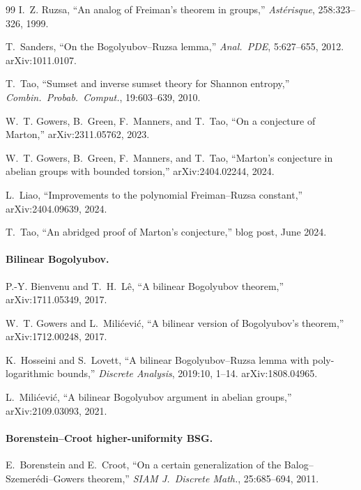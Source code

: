 \documentclass[11pt,a4paper]{article}
\theoremstyle{plain}
\theoremstyle{definition}
\theoremstyle{remark}
\begin{document}
\begin{thebibliography}{99}
I.~Z. Ruzsa, ``An analog of Freiman's theorem in groups,'' \emph{Ast\'erisque}, 258:323--326, 1999.

T.~Sanders, ``On the Bogolyubov--Ruzsa lemma,'' \emph{Anal.\ PDE}, 5:627--655, 2012. arXiv:1011.0107.

T.~Tao, ``Sumset and inverse sumset theory for Shannon entropy,'' \emph{Combin.\ Probab.\ Comput.}, 19:603--639, 2010.

W.~T. Gowers, B.~Green, F.~Manners, and T.~Tao, ``On a conjecture of Marton,'' arXiv:2311.05762, 2023.

W.~T. Gowers, B.~Green, F.~Manners, and T.~Tao, ``Marton's conjecture in abelian groups with bounded torsion,'' arXiv:2404.02244, 2024.

L.~Liao, ``Improvements to the polynomial Freiman--Ruzsa constant,'' arXiv:2404.09639, 2024.

T.~Tao, ``An abridged proof of Marton's conjecture,'' blog post, June 2024.

\paragraph{Bilinear Bogolyubov.}

P.-Y. Bienvenu and T.~H.~L\^e, ``A bilinear Bogolyubov theorem,'' arXiv:1711.05349, 2017.

W.~T. Gowers and L.~Mili\'cevi\'c, ``A bilinear version of Bogolyubov's theorem,'' arXiv:1712.00248, 2017.

K.~Hosseini and S.~Lovett, ``A bilinear Bogolyubov--Ruzsa lemma with poly-logarithmic bounds,'' \emph{Discrete Analysis}, 2019:10, 1--14. arXiv:1808.04965.

L.~Mili\'cevi\'c, ``A bilinear Bogolyubov argument in abelian groups,'' arXiv:2109.03093, 2021.

\paragraph{Borenstein--Croot higher-uniformity BSG.}

E.~Borenstein and E.~Croot, ``On a certain generalization of the Balog--Szemer\'edi--Gowers theorem,'' \emph{SIAM J.\ Discrete Math.}, 25:685--694, 2011.


\end{thebibliography}
\end{document}

